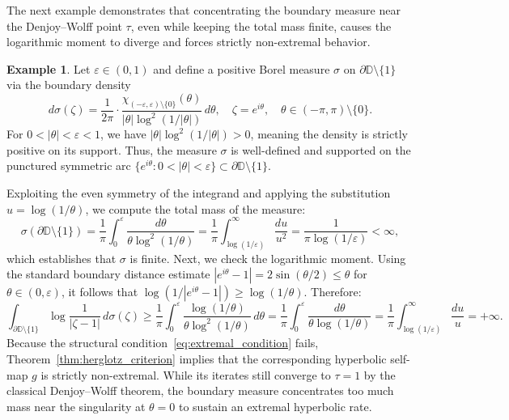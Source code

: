 \documentclass[12pt]{amsart}
\numberwithin{equation}{section}
\theoremstyle{plain}
\theoremstyle{definition}
\newtheorem{example}[equation]{Example}
\begin{document}
The next example demonstrates that concentrating the boundary measure near the Denjoy--Wolff point $\tau$, even while keeping the total mass finite, causes the logarithmic moment to diverge and forces strictly non-extremal behavior.
\begin{example}
\label{ex:concentrated}
Let $\varepsilon\in(0,1)$ and define a positive Borel measure $\sigma$ on $\partial\mathbb{D}\setminus\{1\}$ via the boundary density
\begin{equation}
\label{eq:conc_measure}
d\sigma(\zeta)
=\frac{1}{2\pi}
\cdot
\frac{\chi_{(-\varepsilon,\varepsilon)\setminus\{0\}}(\theta)}
{|\theta|\log^2(1/|\theta|)}
\,d\theta,
\quad\zeta=e^{i\theta},
\quad\theta\in(-\pi,\pi)\setminus\{0\}.
\end{equation}
For $0 < |\theta| < \varepsilon < 1$, we have $|\theta|\log^2(1/|\theta|)>0$, meaning the density is strictly positive on its support. Thus, the measure $\sigma$ is well-defined and supported on the punctured symmetric arc $\{e^{i\theta}:0 < |\theta|<\varepsilon\} \subset\partial\mathbb{D}\setminus\{1\}$.

Exploiting the even symmetry of the integrand and applying the substitution $u=\log(1/\theta)$, we compute the total mass of the measure:
\begin{equation*}
\sigma(\partial\mathbb{D}\setminus\{1\})
=\frac{1}{\pi}\int_0^{\varepsilon}
\frac{d\theta}{\theta\log^2(1/\theta)}
=\frac{1}{\pi}\int_{\log(1/\varepsilon)}^{\infty}
\frac{du}{u^2}
=\frac{1}{\pi\log(1/\varepsilon)}<\infty,
\end{equation*}
which establishes that $\sigma$ is finite. Next, we check the logarithmic moment. Using the standard boundary distance estimate $|e^{i\theta}-1| = 2\sin(\theta/2)\le\theta$ for $\theta\in(0,\varepsilon)$, it follows that $\log(1/|e^{i\theta}-1|) \ge \log(1/\theta)$. Therefore:
\begin{equation*}
\int_{\partial\mathbb{D}\setminus\{1\}}
\log\frac{1}{|\zeta-1|}\,d\sigma(\zeta)
\ge\frac{1}{\pi}\int_0^{\varepsilon}
\frac{\log(1/\theta)}{\theta\log^2(1/\theta)}\,d\theta
=\frac{1}{\pi}\int_0^{\varepsilon}
\frac{d\theta}{\theta\log(1/\theta)}
=\frac{1}{\pi}\int_{\log(1/\varepsilon)}^{\infty}
\frac{du}{u}=+\infty.
\end{equation*}
Because the structural condition~\eqref{eq:extremal_condition} fails, Theorem~\ref{thm:herglotz_criterion} implies that the corresponding hyperbolic self-map $g$ is strictly non-extremal. While its iterates still converge to $\tau=1$ by the classical Denjoy--Wolff theorem, the boundary measure concentrates too much mass near the singularity at $\theta=0$ to sustain an extremal hyperbolic rate.
\end{example}
\end{document}
